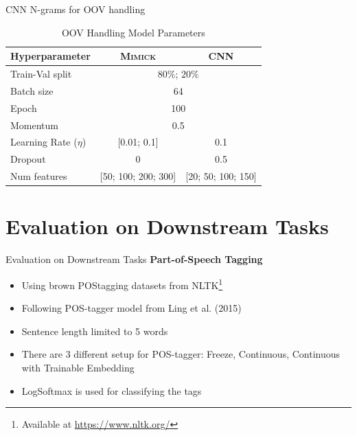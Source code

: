 \documentclass{beamer}
\begin{document}
\begin{frame}{CNN N-grams for OOV handling}

    \begin{table}[]
        \centering
        \caption{OOV Handling Model Parameters}
        \label{tab:hyperparameter}
        \begin{tabular}{@{}lcc@{}}
            \toprule
            \textbf{Hyperparameter} & \multicolumn{1}{c}{\textbf{\textsc{Mimick}}} & \multicolumn{1}{c}{\textbf{CNN}} \\ \midrule
            Train-Val split & \multicolumn{2}{c}{$80\%$; $20\%$}\\
            Batch size & \multicolumn{2}{c}{64} \\
            Epoch & \multicolumn{2}{c}{100} \\
            Momentum & \multicolumn{2}{c}{0.5} \\
            Learning Rate ($\eta$) & [0.01; 0.1] & 0.1 \\
            Dropout & 0 & 0.5 \\
            Num features & [50; 100; 200; 300] & [20; 50; 100; 150] \\ \bottomrule
        \end{tabular}
    \end{table}
\end{frame}
\section{Evaluation on Downstream Tasks}
\begin{frame}{Evaluation on Downstream Tasks}
    \textbf{Part-of-Speech Tagging}
    \begin{itemize}
        \item Using brown POStagging datasets from NLTK\footnote{Available at \url{https://www.nltk.org/}}
        \item Following POS-tagger model from Ling et al. (2015) \cite{finding2015ling}
        \item Sentence length limited to 5 words
        \item There are 3 different setup for POS-tagger: Freeze,
        Continuous, Continuous with Trainable Embedding
        \item LogSoftmax is used for classifying the tags
    \end{itemize}
\end{frame}
\end{document}
